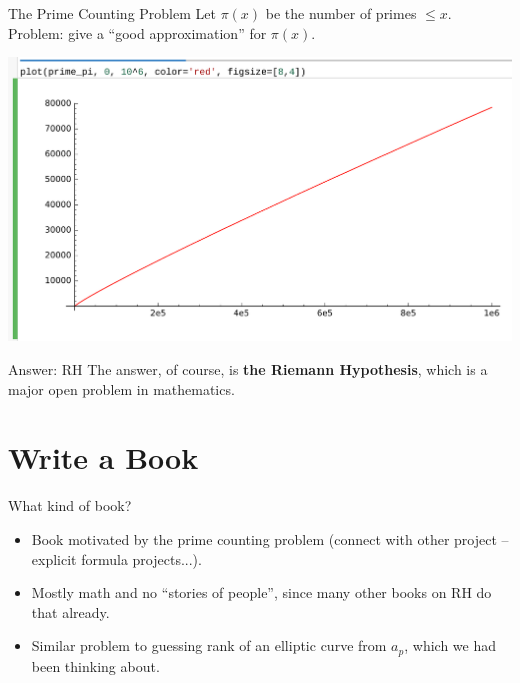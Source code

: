 \documentclass{beamer}
\begin{document}
\begin{frame}{The Prime Counting Problem}
  Let $\pi(x)$ be the number of primes $\leq x$.\\
  Problem: give a ``good approximation'' for $\pi(x)$.
  \vfill

  \includegraphics[width=.98\textwidth]{pics/prime-pi-1000000.png}

\end{frame}

\begin{frame}{Answer: RH}
  The answer, of course, is \textbf{the Riemann Hypothesis}, which is
  a major open problem in mathematics.
\end{frame}


\section{Write a Book}

\begin{frame}{What kind of book?}
  \begin{itemize}
    \item   Book motivated by the prime counting problem (connect with other project -- explicit formula projects...).
    \item Mostly math and no ``stories of people'', since many other books on RH do that already.
    \item Similar problem to guessing rank of an elliptic curve from $a_p$, which we had been thinking about.
  \end{itemize}
\end{frame}
\end{document}
